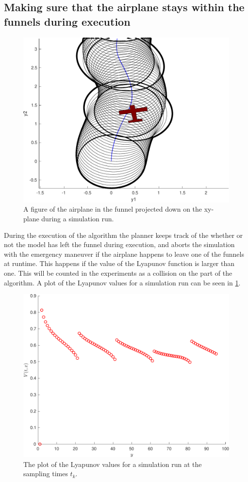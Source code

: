 \subsection{Making sure that the airplane stays within the funnels during
  execution}
\label{subsec:check-vehicle-in-funnel}

\begin{figure}
  \centering
  \includegraphics[width=.8\textwidth]{figures/experiments/airplane-in-funnel} \caption{A
    figure of the airplane in the funnel projected down on the xy-plane during a
    simulation run.}
\end{figure}

During the execution of the \rrtfunnel{} algorithm the planner keeps track of
the whether or not the model has left the funnel during execution, and aborts
the simulation with the emergency maneuver if the airplane happens to leave one
of the funnels at runtime. This happens if the value of the Lyapunov function is
larger than one. This will be counted in the experiments as a collision on the
part of the \rrtfunnel{} algorithm. A plot of the Lyapunov values for a
simulation run can be seen in \cref{fig:lyapunov-values}.

\begin{figure}
  \centering
  \includegraphics[width=.8\textwidth]{figures/experiments/lyapunov-values-simulation-run}
  \caption{The plot of the Lyapunov values for a simulation run at the sampling
    times \(t_k\).}
  \label{fig:lyapunov-values}
\end{figure}

